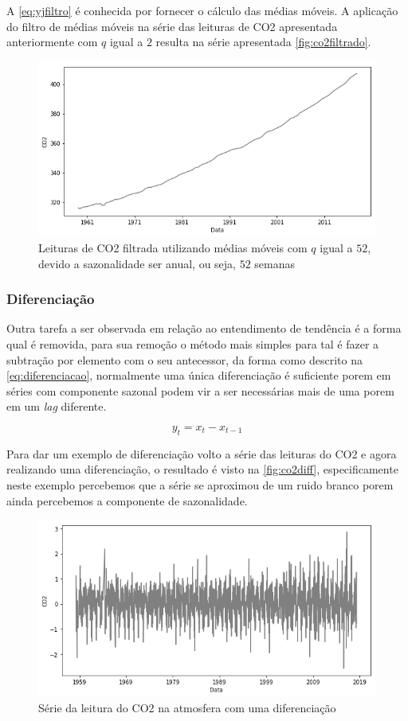 \documentclass[
	12pt,
	oneside,
	a4paper,
	english,
	brazil
]{abntex2}
\begin{document}
A \autoref{eq:yjfiltro} é conhecida por fornecer o cálculo das médias móveis. A 
aplicação do filtro de médias móveis na série das leituras de CO2 apresentada 
anteriormente com $q$ igual a $2$ resulta na série apresentada 
\autoref{fig:co2filtrado}.

\begin{figure}
    \centering
    \caption{Leituras de CO2 filtrada utilizando médias móveis com $q$ igual a 
    $52$, devido a sazonalidade ser anual, ou seja, $52$ 
    semanas}\label{fig:co2filtrado}
    \includegraphics[width=.6\linewidth]{images/co2_filtered.png}
\end{figure}

\subsubsection{Diferenciação}\label{sec:diff}

Outra tarefa a ser observada em relação ao entendimento de tendência é a forma 
qual é removida, para sua remoção o método mais simples para tal é fazer a 
subtração por elemento com o seu antecessor, da forma como descrito na 
\autoref{eq:diferenciacao}, normalmente uma única diferenciação é suficiente 
porem em séries com componente sazonal podem vir a ser necessárias mais de uma 
porem em um \textit{lag} diferente.

\begin{equation}
    \label{eq:diferenciacao}
    y_t = x_t - x_{t-1}
\end{equation}

Para dar um exemplo de diferenciação volto a série das leituras do CO2 e agora 
realizando uma diferenciação, o resultado é visto na \autoref{fig:co2diff}, 
especificamente neste exemplo percebemos que a série se aproximou de um ruido 
branco porem ainda percebemos a componente de sazonalidade.

\begin{figure}
    \centering
    \caption{Série da leitura do CO2 na atmosfera com uma 
    diferenciação}\label{fig:co2diff}
    \includegraphics[width=.6\linewidth]{images/co2_diff.png}
\end{figure}
\end{document}
